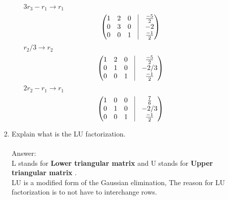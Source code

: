 \documentclass{article}
\begin{document}
\begin{enumerate}
\begin{enumerate}
\begin{enumerate}
                $3r_3 - r_1 \rightarrow r_1$
                 $$\begin{pmatrix} 1 & 2 & 0 &\vline & \frac{-5}{2}\\
                0 & 3 & 0 &\vline & -2 \\ 
                0 & 0 & 1  & \vline  & \frac{-1}{2} \end{pmatrix}$$
                $r_2/3 \rightarrow r_2$
                 $$\begin{pmatrix} 1 & 2 & 0 &\vline & \frac{-5}{2}\\
                0 & 1 & 0 &\vline & -2/3 \\ 
                0 & 0 & 1  & \vline  & \frac{-1}{2} \end{pmatrix}$$
                $2r_2 - r_1\rightarrow r_1$
                 $$\begin{pmatrix} 1 & 0 & 0 &\vline & \frac{7}{6}\\
                0 & 1 & 0 &\vline & -2/3 \\ 
                0 & 0 & 1  & \vline  & \frac{-1}{2} \end{pmatrix}$$
            \end{enumerate}
            
        \color{black}
        
        \item Explain what is the LU factorization.\\
        \\
        \color{red}
            Answer:\\ L stands for \textbf{Lower triangular matrix} and U stands for \textbf{Upper triangular matrix} .\\
            LU is a modified form of the Gaussian elimination, The reason for LU factorization is to not have to interchange rows. 
            
        \color{black}
        
    \end{enumerate}
    

\end{enumerate}
\end{document}
